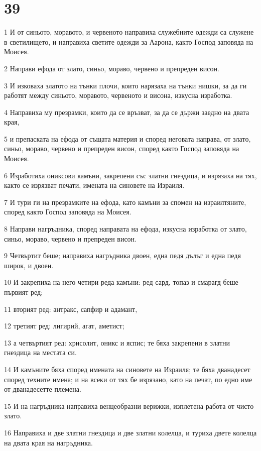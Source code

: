 \chapter{39}

\par 1 И от синьото, моравото, и червеното направиха служебните одежди са служене в светилището, и направиха светите одежди за Аарона, както Господ заповяда на Моисея.
\par 2 Направи ефода от злато, синьо, мораво, червено и препреден висон.
\par 3 И изковаха златото на тънки плочи, които нарязаха на тънки нишки, за да ги работят между синьото, моравото, червеното и висона, изкусна изработка.
\par 4 Направиха му презрамки, които да се връзват, за да се държи заедно на двата края,
\par 5 и препаската на ефода от същата материя и според неговата направа, от злато, синьо, мораво, червено и препреден висон, според както Господ заповяда на Моисея.
\par 6 Изработиха ониксови камъни, закрепени със златни гнездица, и изрязаха на тях, както се изрязват печати, имената на синовете на Израиля.
\par 7 И тури ги на презрамките на ефода, като камъни за спомен на израилтяните, според както Господ заповяда на Моисея.
\par 8 Направи нагръдника, според направата на ефода, изкусна изработка от злато, синьо, мораво, червено и препреден висон.
\par 9 Четвъртит беше; направиха нагръдника двоен, една педя дълъг и една педя широк, и двоен.
\par 10 И закрепиха на него четири реда камъни: ред сард, топаз и смарагд беше първият ред;
\par 11 вторият ред: антракс, сапфир и адамант,
\par 12 третият ред: лигирий, агат, аметист;
\par 13 а четвъртият ред: хрисолит, оникс и яспис; те бяха закрепени в златни гнездица на местата си.
\par 14 И камъните бяха според имената на синовете на Израиля; те бяха дванадесет според техните имена; и на всеки от тях бе изрязано, като на печат, по едно име от дванадесетте племена.
\par 15 И на нагръдника направиха венцеобразни верижки, изплетена работа от чисто злато.
\par 16 Направиха и две златни гнездица и две златни колелца, и туриха двете колелца на двата края на нагръдника.
